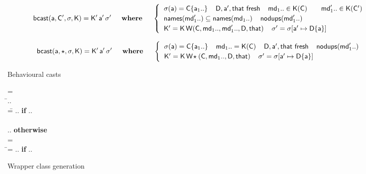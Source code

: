 \documentclass[acmlarge, anonymous, authordraft, review]{acmart} %
\begin{document}
\begin{figure}[!b]
\hrulefill
\small

\vspace{-4mm}

\begin{equation*}
  \behcastE\a\Cp\s\K \Kp\ap\sp \HS\HS\WHERE\HS\HS \begin{cases}
\HS  \App\s\a = \obj\C{\a[1]..} \HS\HS
  \fresh{\D,\ap,\that} \HS\HS
  \md[1].. \In \App\K\C \qquad \mdp[1].. \In \App\K\Cp \\\HS
  \names{\mdp[1]..} \subseteq \names{\md[1]..} \HS\HS \cload{\mdp[1]..} \\\HS
  \Kp = \K\,\wrap\C{\md[1]..}{\mdp[1]..}\D\that \HS\HS
  \sp = \Map \s{\Bind\ap{\obj\D{\a}}} 
  \end{cases}
\end{equation*}

\begin{equation*}
  \behcastE\a\any\s\K \Kp\ap\sp  \HS\HS\WHERE\HS\HS\begin{cases}\HS
  \App\s\a = \obj\C{\a[1]..} \HS\HS \md[1].. = \App\K\C \HS\HS
  \fresh{\D,\ap,\that} \HS\HS \cload{\mdp[1]..} \\\HS
  \Kp = \K\,\wrapAny\C{\md[1]..}\D\that \HS\HS
  \sp = \Map \s{\Bind\ap{\obj\D{\a}}} 
\end{cases}\end{equation*}


\hrulefill
\vspace{-2mm}\caption{Behavioural casts}\label{behavetext}
\end{figure}

\begin{figure}[!t]
\hrulefill
\small

\begin{tabbing}\small
  \wrap{}\D\that = \\
  \HS\HS\WHERE\HS\= \Mdef\m\x{\t[1]}{\t[2]}\e\In\md[1].. \\
                 \> \mdpp[1] =\= \src{\Mdef\m\x{\tp[1]}{\tp[2]}{~\BehCast{\tp[2]}{\KCall{\FRead\that}\m{\bscast{\tp[1]}\x}{\t[1]}{\t[2]}}}} ..
    \HS \= \textbf{if} \HS \Mdef\m\x{\tp[1]}{\tp[2]}\ep\In\mdp[1].. \\
\\[-3mm]
\> \>  \src{\Mdef\m\x{\t[1]}{\t[2]}{~\KCall{\FRead\that}\m{\x}{\t[1]}{\t[2]}}} ..  \>\textbf{otherwise}
\\[3mm]
   = \\
\HS\HS\WHERE\HS\=\mdp[1] = \src{ \Mdef\m\x{\any}{\any}{~\BehCast\any{ \KCall{\FRead\that} \m {\bscast{\t}\x}{\t}{\tp}} } }   ..
    \HS\HS\HS\HS \= \textbf{if} \HS \Mdef\m\x{\t}{\tp}\e\In\md[1].. \\
\end{tabbing}

\vspace{-5mm}

\hrulefill
\vspace{-2mm}
\caption{Wrapper class generation}\label{w}\end{figure}
\end{document}
